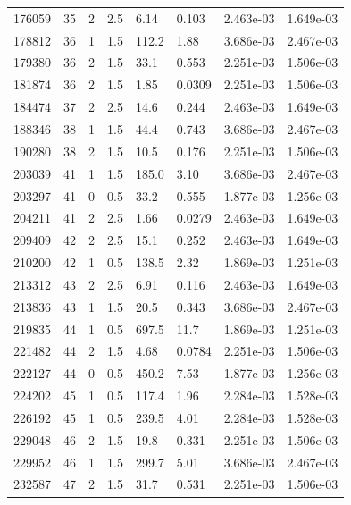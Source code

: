 \documentclass[preview]{standalone}
\begin{document}
{{{\begin{tabular}{L{1.2cm}C{1.2cm} C{0.3cm}C{0.5cm} C{1.4cm}C{1.4cm} C{1.4cm}C{1.4cm}}
  176059  &    35  & 2     & 2.5 &  6.14  & 0.103  & 2.463e-03 &  1.649e-03   \\ 
  178812  &    36  & 1     & 1.5 &  112.2  & 1.88  & 3.686e-03 &  2.467e-03   \\ 
  179380  &    36  & 2     & 1.5 &  33.1  & 0.553  & 2.251e-03 &  1.506e-03   \\ 
  181874  &    36  & 2     & 1.5 &  1.85  & 0.0309  & 2.251e-03 &  1.506e-03   \\ 
  184474  &    37  & 2     & 2.5 &  14.6  & 0.244  & 2.463e-03 &  1.649e-03   \\ 
  188346  &    38  & 1     & 1.5 &  44.4  & 0.743  & 3.686e-03 &  2.467e-03   \\ 
  190280  &    38  & 2     & 1.5 &  10.5  & 0.176  & 2.251e-03 &  1.506e-03   \\ 
  203039  &    41  & 1     & 1.5 &  185.0  & 3.10  & 3.686e-03 &  2.467e-03   \\ 
  203297  &    41  & 0     & 0.5 &  33.2  & 0.555  & 1.877e-03 &  1.256e-03   \\ 
  204211  &    41  & 2     & 2.5 &  1.66  & 0.0279  & 2.463e-03 &  1.649e-03   \\ 
  209409  &    42  & 2     & 2.5 &  15.1  & 0.252  & 2.463e-03 &  1.649e-03   \\ 
  210200  &    42  & 1     & 0.5 &  138.5  & 2.32  & 1.869e-03 &  1.251e-03   \\ 
  213312  &    43  & 2     & 2.5 &  6.91  & 0.116  & 2.463e-03 &  1.649e-03   \\ 
  213836  &    43  & 1     & 1.5 &  20.5  & 0.343  & 3.686e-03 &  2.467e-03   \\ 
  219835  &    44  & 1     & 0.5 &  697.5  & 11.7  & 1.869e-03 &  1.251e-03   \\ 
  221482  &    44  & 2     & 1.5 &  4.68  & 0.0784  & 2.251e-03 &  1.506e-03   \\ 
  222127  &    44  & 0     & 0.5 &  450.2  & 7.53  & 1.877e-03 &  1.256e-03   \\ 
  224202  &    45  & 1     & 0.5 &  117.4  & 1.96  & 2.284e-03 &  1.528e-03   \\ 
  226192  &    45  & 1     & 0.5 &  239.5  & 4.01  & 2.284e-03 &  1.528e-03   \\ 
  229048  &    46  & 2     & 1.5 &  19.8  & 0.331  & 2.251e-03 &  1.506e-03   \\ 
  229952  &    46  & 1     & 1.5 &  299.7  & 5.01  & 3.686e-03 &  2.467e-03   \\ 
  232587  &    47  & 2     & 1.5 &  31.7  & 0.531  & 2.251e-03 &  1.506e-03   \\ 

\end{tabular}}}}
\end{document}
